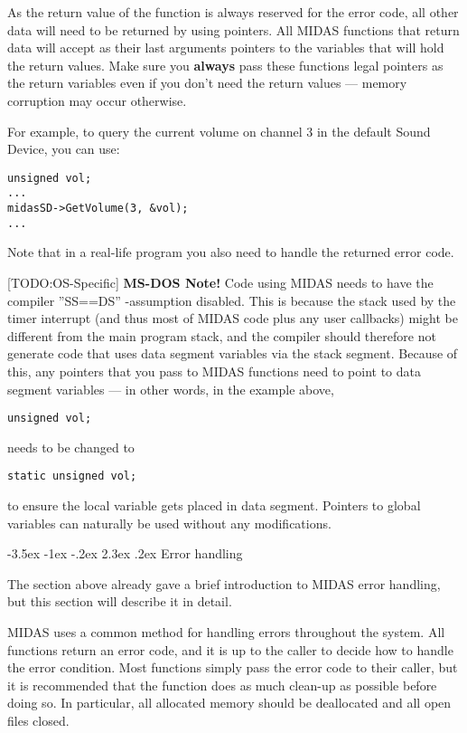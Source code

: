 \documentclass[a4paper,12pt,oneside]{book}
\makeatletter
\renewcommand\section{\@startsection {section}{1}{-20pt}%
                                   {-3.5ex \@plus -1ex \@minus -.2ex}%
                                   {2.3ex \@plus.2ex}%
                                   {\normalfont\Large\bfseries}}
\makeatother
\begin{document}
As the return value of the function is always reserved for the error code,
all other data will need to be returned by using pointers. All MIDAS
functions that return data will accept as their last arguments pointers to
the variables that will hold the return values. Make sure you {\bf always}
pass these functions legal pointers as the return variables even if you don't
need the return values --- memory corruption may occur otherwise.

For example, to query the current volume on channel 3 in the default Sound
Device, you can use:

\begin{verbatim}
unsigned vol;
...
midasSD->GetVolume(3, &vol);
...
\end{verbatim}

Note that in a real-life program you also need to handle the returned error
code.

[TODO:OS-Specific] {\bf MS-DOS Note!} Code using MIDAS needs to have the
compiler ''SS==DS'' -assumption disabled. This is because the stack used by
the timer interrupt (and thus most of MIDAS code plus any user callbacks)
might be different from the main program stack, and the compiler should
therefore not generate code that uses data segment variables via the stack
segment. Because of this, any pointers that you pass to MIDAS functions need
to point to data segment variables --- in other words, in the example above,
\begin{verbatim}
unsigned vol;
\end{verbatim}
needs to be changed to
\begin{verbatim}
static unsigned vol;
\end{verbatim}
to ensure the local variable gets placed in data segment. Pointers to global
variables can naturally be used without any modifications.


\section{Error handling}

The section above already gave a brief introduction to MIDAS error handling,
but this section will describe it in detail.

MIDAS uses a common method for handling errors throughout the system. All
functions return an error code, and it is up to the caller to decide how to
handle the error condition. Most functions simply pass the error code to
their caller, but it is recommended that the function does as much clean-up
as possible before doing so. In particular, all allocated memory should be
deallocated and all open files closed.
\end{document}
